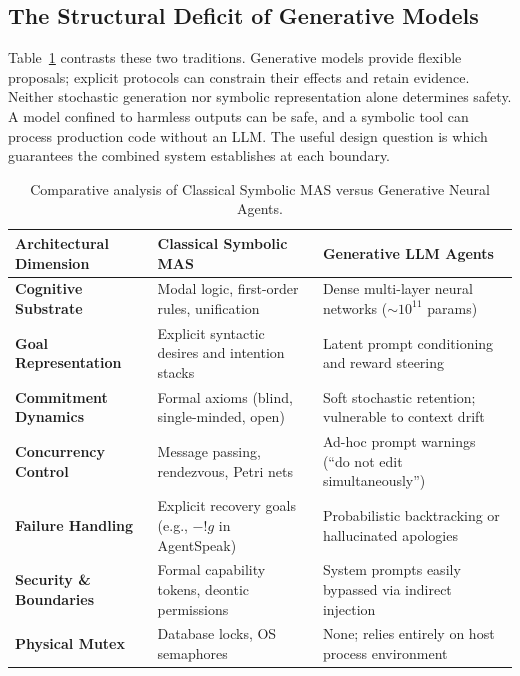 \subsection{The Structural Deficit of Generative Models}

Table~\ref{tab:lineage-comparison} contrasts these two traditions. Generative
models provide flexible proposals; explicit protocols can constrain their effects
and retain evidence. Neither stochastic generation nor symbolic representation
alone determines safety. A model confined to harmless outputs can be safe, and
a symbolic tool can process production code without an LLM. The useful design
question is which guarantees the combined system establishes at each boundary.

\begin{table}[H]
\centering
\small
\begin{tabularx}{\textwidth}{l >{\raggedright\arraybackslash}X >{\raggedright\arraybackslash}X}
\toprule
\textbf{Architectural Dimension} & \textbf{Classical Symbolic MAS} & \textbf{Generative LLM Agents} \\
\midrule
\textbf{Cognitive Substrate} & Modal logic, first-order rules, unification & Dense multi-layer neural networks ($\sim 10^{11}$ params) \\
\textbf{Goal Representation} & Explicit syntactic desires and intention stacks & Latent prompt conditioning and reward steering \\
\textbf{Commitment Dynamics} & Formal axioms (blind, single-minded, open) & Soft stochastic retention; vulnerable to context drift \\
\textbf{Concurrency Control} & Message passing, rendezvous, Petri nets & Ad-hoc prompt warnings (``do not edit simultaneously'') \\
\textbf{Failure Handling} & Explicit recovery goals (e.g., $-!g$ in AgentSpeak) & Probabilistic backtracking or hallucinated apologies \\
\textbf{Security \& Boundaries} & Formal capability tokens, deontic permissions & System prompts easily bypassed via indirect injection \\
\textbf{Physical Mutex} & Database locks, OS semaphores & None; relies entirely on host process environment \\
\bottomrule
\end{tabularx}
\caption{Comparative analysis of Classical Symbolic MAS versus Generative Neural Agents.}
\label{tab:lineage-comparison}
\end{table}

